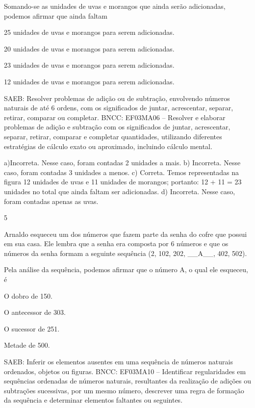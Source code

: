 {\begin{escolha}
{Somando-se as unidades de uvas e morangos que ainda serão adicionadas, podemos afirmar que ainda faltam

\begin{escolha}

\item
  25 unidades de uvas e morangos para serem adicionadas.
\item
  20 unidades de uvas e morangos para serem adicionadas.
\item
  23 unidades de uvas e morangos para serem adicionadas.
\item
  12 unidades de uvas e morangos para serem adicionadas.
\end{escolha}

SAEB: Resolver problemas de adição ou de subtração,
envolvendo números naturais de até 6 ordens, com os significados de
juntar, acrescentar, separar, retirar, comparar ou completar.
BNCC: EF03MA06 – Resolver e elaborar problemas de adição e subtração com os significados de
juntar, acrescentar, separar, retirar, comparar e completar quantidades, utilizando diferentes
estratégias de cálculo exato ou aproximado, incluindo cálculo mental.

a)Incorreta. Nesse caso, foram contadas 2 unidades a mais.
b) Incorreta. Nesse caso, foram contadas 3 unidades a menos.
c) Correta. Temos representadas na figura 12 unidades de uvas e 11 unidades de morangos; portanto: 12 + 11 = 23 unidades no total que ainda faltam ser adicionadas.
d) Incorreta. Nesse caso, foram contadas apenas as uvas.

\num{5}

Arnaldo esqueceu um dos números que fazem parte da senha do cofre que
possui em sua casa. Ele lembra que a senha era composta por 6 números e
que os números da senha formam a seguinte sequência (2, 102, 202,
\_\_A\_\_, 402, 502).

Pela análise da sequência, podemos afirmar que o número A, o qual ele esqueceu, é

\begin{escolha}

\item
  O dobro de 150.
\item
  O antecessor de 303.
\item
  O sucessor de 251.
\item
  Metade de 500.
\end{escolha}

SAEB: Inferir os elementos ausentes em uma sequência de
números naturais ordenados, objetos ou figuras.
BNCC: EF03MA10 -- Identificar regularidades em sequências ordenadas de números naturais,
resultantes da realização de adições ou subtrações sucessivas, por um mesmo número,
descrever uma regra de formação da sequência e determinar elementos faltantes ou seguintes.

}
\end{escolha}}
